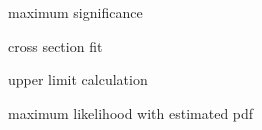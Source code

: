 
maximum significance

cross section fit

upper limit calculation

maximum likelihood with estimated pdf
